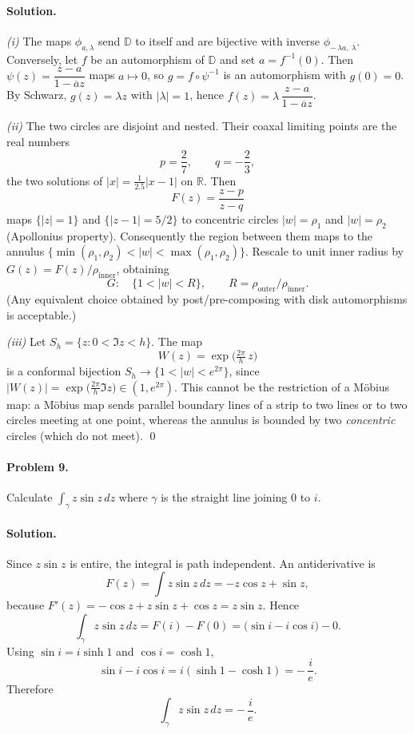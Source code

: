 \documentclass[11pt,a4paper]{article}
\theoremstyle{definition}
\theoremstyle{definition}
\theoremstyle{plain}
\theoremstyle{remark}
\begin{document}
\paragraph{Solution.}
\emph{(i)} The maps $\phi_{a,\lambda}$ send $\mathbb D$ to itself and are bijective with inverse $\phi_{-\,\lambda a,\ \overline{\lambda}}$.
Conversely, let $f$ be an automorphism of $\mathbb D$ and set $a=f^{-1}(0)$. Then
$\psi(z)=\dfrac{z-a}{1-\overline{a}z}$ maps $a\mapsto0$, so $g=f\circ\psi^{-1}$ is an automorphism with $g(0)=0$.
By Schwarz, $g(z)=\lambda z$ with $|\lambda|=1$, hence $f(z)=\lambda\,\dfrac{z-a}{1-\overline{a}z}$.

\medskip
\emph{(ii)} The two circles are disjoint and nested. Their coaxal limiting points are the real numbers
\[
p=\frac{2}{7},\qquad q=-\frac{2}{3},
\]
the two solutions of $|x|=\tfrac{1}{2.5}|x-1|$ on $\mathbb R$.
Then
\[
F(z)=\frac{z-p}{z-q}
\]
maps $\{|z|=1\}$ and $\{|z-1|=5/2\}$ to concentric circles $|w|=\rho_1$ and $|w|=\rho_2$ (Apollonius property).
Consequently the region between them maps to the annulus $\{\min(\rho_1,\rho_2)<|w|<\max(\rho_1,\rho_2)\}$.
Rescale to unit inner radius by $G(z)=F(z)/\rho_{\mathrm{inner}}$, obtaining
\[
G:\quad \{1<|w|<R\},\qquad R=\rho_{\mathrm{outer}}/\rho_{\mathrm{inner}}.
\]
(Any equivalent choice obtained by post/pre-composing with disk automorphisms is acceptable.)

\medskip
\emph{(iii)} Let $S_h=\{z:0<\Im z<h\}$. The map
\[
W(z)=\exp\!\Big(\tfrac{2\pi}{h}\,z\Big)
\]
is a conformal bijection $S_h\to \{1<|w|<e^{2\pi}\}$, since $|W(z)|=\exp\!\big(\tfrac{2\pi}{h}\Im z\big)\in(1,e^{2\pi})$.
This cannot be the restriction of a Möbius map: a Möbius map sends parallel boundary lines of a strip to two lines or to two circles meeting at one point, whereas the annulus is bounded by two \emph{concentric} circles (which do not meet).
\qed

\paragraph{Problem 9.}
Calculate $\displaystyle \int_{\gamma} z\sin z\,dz$ where $\gamma$ is the straight line joining $0$ to $i$.

\paragraph{Solution.}
Since $z\sin z$ is entire, the integral is path independent. An antiderivative is
\[
F(z)=\int z\sin z\,dz=-z\cos z+\sin z,
\]
because $F'(z)=-\cos z+z\sin z+\cos z=z\sin z$. Hence
\[
\int_{\gamma} z\sin z\,dz = F(i)-F(0)
= \big(\sin i - i\cos i\big)-0.
\]
Using $\sin i = i\sinh 1$ and $\cos i=\cosh 1$,
\[
\sin i - i\cos i = i(\sinh 1-\cosh 1) = -\,\frac{i}{e}.
\]
Therefore
\[
\boxed{\displaystyle \int_{\gamma} z\sin z\,dz = -\,\frac{i}{e}.}
\]
\end{document}
